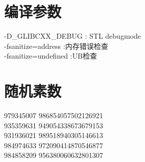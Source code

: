 \section{编译参数}
-D\_GLIBCXX\_DEBUG : STL debugmode\\
-fsanitize=address :内存错误检查\\
-fsanitize=undefined :UB检查
\section{随机素数}
979345007 986854057502126921\\
935359631 949054338673679153\\
931936021 989518940305146613\\
984974633 972090414870546877\\
984858209 956380060632801307\\

